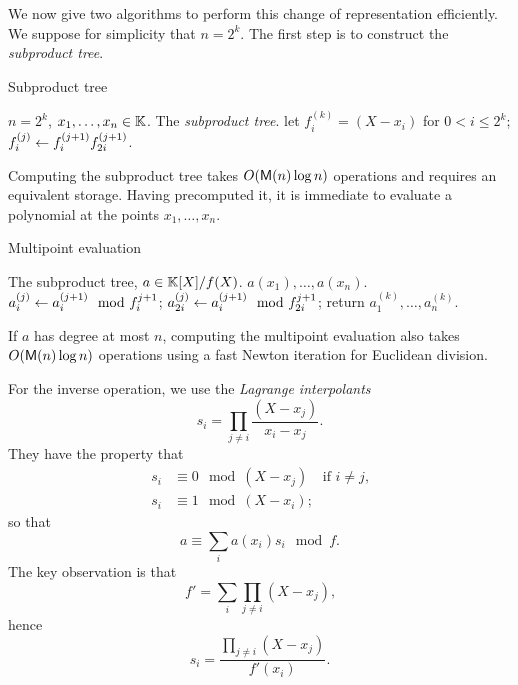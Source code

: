 We now give two algorithms to perform this change of representation
efficiently. We suppose for simplicity that $n=2^k$. The first step is
to construct the \textit{subproduct tree}.

\begin{algorithm}
  \caption{\label{alg:subprod}Subproduct tree}
  \begin{algorithmic}[1]
    \REQUIRE $n=2^k$, $x_1,\ldots,x_n\in\mathbb{K}$.
    \ENSURE The \emph{subproduct tree}.
    \STATE let $f_i^{(k)}=(X-x_i)$ for $0<i\le2^k$;
    \STATE $f^{(j)}_i \leftarrow f^{(j+1)}_if^{(j+1)}_{2i}$.
    \ENDFOR
    \ENDFOR
  \end{algorithmic}
\end{algorithm}

Computing the subproduct tree takes $O(\mathsf{M}(n)\log n)$ operations and
requires an equivalent storage. Having precomputed it, it is immediate
to evaluate a polynomial at the points $x_1,\ldots,x_n$.

\begin{algorithm}
  \caption{Multipoint evaluation}
  \begin{algorithmic}[1]
    \REQUIRE The subproduct tree, $a\in\mathbb{K}[X]/f(X)$.
    \ENSURE $a(x_1),\ldots,a(x_n)$.
    \STATE $a_i^{(j)} \leftarrow a_i^{(j+1)} \mod f_{i}^{j+1}$;
    \STATE $a_{2i}^{(j)} \leftarrow a_i^{(j+1)} \mod f_{2i}^{j+1}$;
    \ENDFOR
    \ENDFOR
    \STATE return $a_1^{(k)},\ldots,a_n^{(k)}$.
  \end{algorithmic}
\end{algorithm}

If $a$ has degree at most $n$, computing the multipoint evaluation
also takes $O(\mathsf{M}(n)\log n)$ operations using a fast Newton
iteration for Euclidean division.

For the inverse operation, we use the
\textit{Lagrange interpolants} 
\begin{equation}
  \label{eq:223}
  s_i = \prod_{j\ne i}\frac{(X-x_j)}{x_i-x_j}
  \text{.}
\end{equation}
They have the property that
\begin{equation}
  \label{eq:224}
  \begin{aligned}
    s_i &\equiv 0 \mod (X-x_j) &\text{if $i\ne j$,}\\
    s_i &\equiv 1 \mod (X-x_i)\text{;}
  \end{aligned}
\end{equation}
so that
\begin{equation}
  \label{eq:225}
  a \equiv \sum_i a(x_i)s_i \mod f
  \text{.}
\end{equation}
The key observation is that
\begin{equation}
  \label{eq:226}
  f' = \sum_{i}\prod_{j\ne i}(X-x_j)
  \text{,}
\end{equation}
hence
\begin{equation}
  \label{eq:227}
  s_i = \frac{\prod_{j\ne i}(X-x_j)}{f'(x_i)}
  \text{.}
\end{equation}

